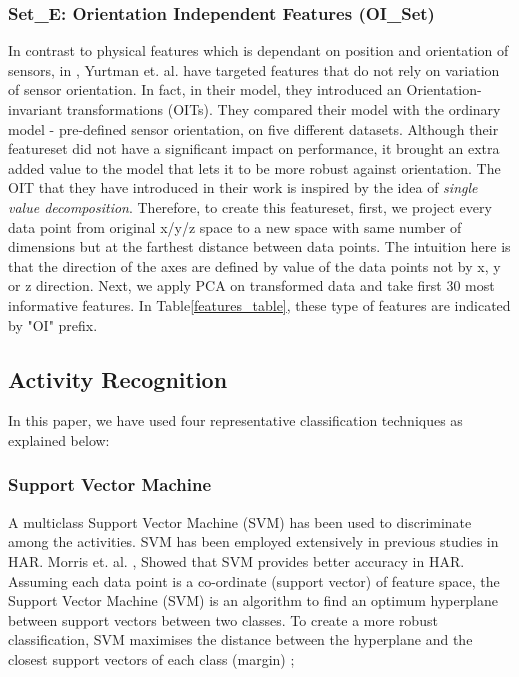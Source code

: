 \documentclass[journal,article,submit,moreauthors,pdftex]{Definitions/mdpi}
\begin{document}
\subsubsection{Set\_E: Orientation Independent Features (OI\_Set)}
In contrast to physical features which is dependant on position and orientation of sensors, in \cite{yurtman2017activity}, Yurtman et. al. have targeted features that do not rely on variation of sensor orientation. In fact, in their model, they introduced an Orientation-invariant transformations (OITs). They compared their model with the ordinary model - pre-defined sensor orientation, on five different datasets. Although their featureset did not have a significant impact on performance, it brought an extra added value to the model that lets it to be more robust against orientation. The OIT that they have introduced in their work is inspired by the idea of \textit{single value decomposition}\cite{moon2000mathematical}. Therefore, to create this featureset, first, we project every data point from original x/y/z space to a new space with same number of dimensions but at the farthest distance between data points. The intuition here is that the direction of the axes are defined by value of the data points not by x, y or z direction. Next, we apply PCA on transformed data and take first 30 most informative features. In Table\ref{features_table}, these type of features  are indicated by "OI" prefix.

\subsection{Activity Recognition}
In this paper, we have used four representative classification techniques as explained below:

\subsubsection{Support Vector Machine}
A multiclass Support Vector Machine (SVM) has been used to discriminate among the activities. SVM has been employed extensively in previous studies in HAR. Morris et. al. \cite{morris2014recofit}, \cite{rosati2018comparison} Showed that SVM provides better accuracy in HAR. 
Assuming each data point is a co-ordinate (support vector) of feature space, the Support Vector Machine (SVM) is an algorithm to find an optimum hyperplane between support vectors between two classes. To create a more robust classification, SVM maximises the distance between the hyperplane and the closest support vectors of each class (margin) \cite{zhang2012physical};
\end{document}
